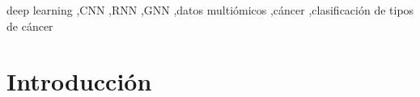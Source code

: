 \documentclass[review,12pt,times,number]{elsarticle}
\begin{document}
\begin{frontmatter}
\begin{abstract}


\end{abstract}




\begin{keyword}
deep learning \sep CNN \sep RNN \sep GNN \sep datos multiómicos \sep cáncer \sep clasificación de tipos de cáncer



\end{keyword}


\end{frontmatter}




\section{Introducción}
\label{Introducción}
\end{document}
